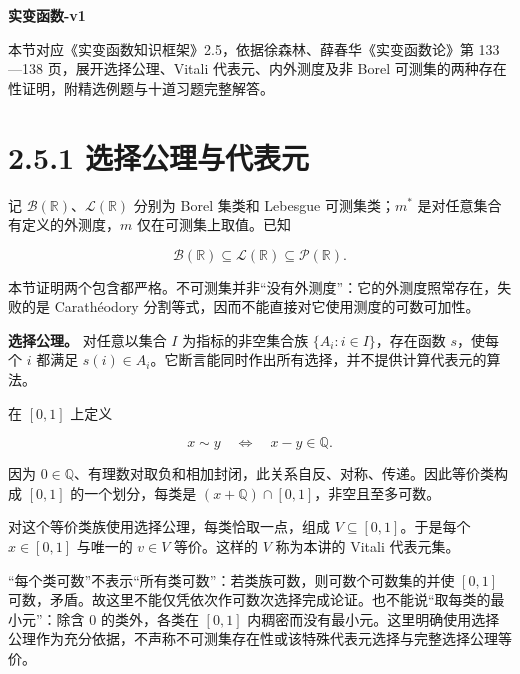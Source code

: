 \documentclass[11pt,a4paper]{article}
\begin{document}
\begin{center}
{\Large\bfseries 实变函数-v1\par}
\vspace{7pt}{\large 2.5 不可测集\par}
\vspace{5pt}{第二章 Lebesgue 测度\par}
\end{center}
本节对应《实变函数知识框架》2.5，依据徐森林、薛春华《实变函数论》第 133—138 页，展开选择公理、Vitali 代表元、内外测度及非 Borel 可测集的两种存在性证明，附精选例题与十道习题完整解答。
\begingroup\setlength{\parskip}{0pt}\tableofcontents\endgroup

\section[\S{}2.5.1
选择公理与代表元]{2.5.1
选择公理与代表元}\label{ux9009ux62e9ux516cux7406ux4e0eux4ee3ux8868ux5143}

记 \(\mathcal B(\mathbb R)\)、\(\mathcal L(\mathbb R)\) 分别为 Borel
集类和 Lebesgue 可测集类；\(m^*\) 是对任意集合有定义的外测度，\(m\)
仅在可测集上取值。已知

\begin{equation*}
\mathcal B(\mathbb R)\subseteq\mathcal L(\mathbb R)\subseteq\mathcal P(\mathbb R).
\tag{2.5.1}
\end{equation*}

本节证明两个包含都严格。不可测集并非``没有外测度''：它的外测度照常存在，失败的是
Carathéodory 分割等式，因而不能直接对它使用测度的可数可加性。

\textbf{选择公理。} 对任意以集合 \(I\) 为指标的非空集合族
\(\{A_i:i\in I\}\)，存在函数 \(s\)，使每个 \(i\) 都满足
\(s(i)\in A_i\)。它断言能同时作出所有选择，并不提供计算代表元的算法。

在 \([0,1]\) 上定义

\begin{equation*}
x\sim y\quad\Longleftrightarrow\quad x-y\in\mathbb Q.
\tag{2.5.2}
\end{equation*}

因为
\(0\in\mathbb Q\)、有理数对取负和相加封闭，此关系自反、对称、传递。因此等价类构成
\([0,1]\) 的一个划分，每类是
\((x+\mathbb Q)\cap[0,1]\)，非空且至多可数。

对这个等价类族使用选择公理，每类恰取一点，组成
\(V\subseteq[0,1]\)。于是每个 \(x\in[0,1]\) 与唯一的 \(v\in V\)
等价。这样的 \(V\) 称为本讲的 Vitali 代表元集。

``每个类可数''不表示``所有类可数''：若类族可数，则可数个可数集的并使
\([0,1]\)
可数，矛盾。故这里不能仅凭依次作可数次选择完成论证。也不能说``取每类的最小元''：除含
\(0\) 的类外，各类在 \([0,1]\)
内稠密而没有最小元。这里明确使用选择公理作为充分依据，不声称不可测集存在性或该特殊代表元选择与完整选择公理等价。
\end{document}
